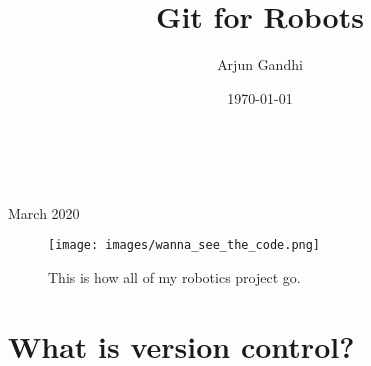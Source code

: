 \documentclass{article}
\title{Git for Robots}
\author{Arjun Gandhi}
\date{\today}
\begin{document}

\newtheorem*{defi}{Definition}
\newenvironment{definition}%
  {\begin{mdframed}[backgroundcolor=defcolor]\begin{defi}}%
  {\end{defi}\end{mdframed}}
\newtheorem*{conce}{Concept}
\newenvironment{concept}%
  {\begin{mdframed}[backgroundcolor=concolor]\begin{conce}}%
  {\end{conce}\end{mdframed}}
\newtheorem{gold}{Golden Rule}
\newenvironment{golden-rule}%
  {\begin{mdframed}[backgroundcolor=goldcolor]\begin{gold}}%
  {\end{gold}\end{mdframed}}
  
\newtheorem*{n}{Note}
\newenvironment{note}%
  {\begin{mdframed}[backgroundcolor=ncolor]\begin{n}}%
  {\end{n}\end{mdframed}}
  
\begin{titlepage}
		\\
			
		\vspace{10mm}
		\\
		\vspace{\fill}
		\centering \large{March 2020}
\end{titlepage}


\newpage{}
\thispagestyle {empty}

\vspace*{2cm}

\begin{figure}
    \centering
	\texttt{[image: images/wanna\_see\_the\_code.png]}
	\caption{This is how all of my robotics project go.}
\end{figure}

\newpage
{
\hypersetup{
linkcolor=black,
urlcolor=black,}

\tableofcontents

}

\newpage
\section{What is version control?}
\end{document}
